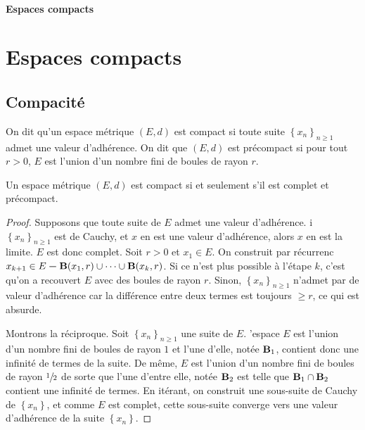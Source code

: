 \ifsolo
    ~

    \vspace{1cm}

    \begin{center}
        \textbf{\LARGE Espaces compacts} \\[1em]
    \end{center}
    \tableofcontents
\else
    \chapter{Espaces compacts}

    \minitoc
\fi
\thispagestyle{empty}


\section{Compacité}

\begin{dfn}
    On dit qu'un espace métrique $(E, d)$ est compact si toute suite  $\left\{ x_n \right\} _{n\geq 1}$ admet une valeur d'adhérence. On dit que $(E, d)$ est précompact si pour tout  $r>0$,  $E$ est l'union d'un nombre fini de boules de rayon  $r$.
\end{dfn}

\begin{thm}
    Un espace métrique $(E, d)$ est compact  si et seulement s'il est complet et précompact.
\end{thm}

\begin{proof}
    Supposons que toute suite de $E$ admet une valeur d'adhérence.  i $ \left\{ x_n \right\}_{n\geq 1} $ est de Cauchy, et $x$ en est une valeur d'adhérence, alors $x$ en est la limite. $E$ est donc complet. Soit $r>0$ et $x_1 \in  E$. On construit par récurrenc $x _{k+1} \in  E \bm- \mathbf B(x_1,r)\cup \cdots \cup \mathbf B(x_k, r)$. Si ce n'est plus possible à l'étape $k$, c'est qu'on a recouvert $E$ avec des boules de rayon $r$. Sinon, $ \left\{ x_n \right\}_{n\geq 1} $ n'admet par de valeur d'adhérence car la différence entre deux termes est toujours $ \geq r$, ce qui est absurde.

    Montrons la réciproque. Soit $ \left\{ x_n \right\}_{n\geq 1} $ une suite de $E$.  'espace $E$ est l'union d'un nombre fini de boules de rayon $1$ et l'une d'elle, notée $ \mathbf B_1$, contient donc une infinité de termes de la suite. De même, $E$ est l'union d'un nombre fini de boules de rayon $\sfrac12$ de sorte que l'une d'entre elle, notée  $\mathbf B_2$ est telle que  $\mathbf B_1\cap \mathbf B_2$ contient une infinité de termes. En itérant, on construit une sous-suite de Cauchy de $\left\{ x_n \right\} $, et comme $E$ est complet, cette sous-suite converge vers une valeur d'adhérence de la suite  $\left\{ x_n \right\} $.
\end{proof}

